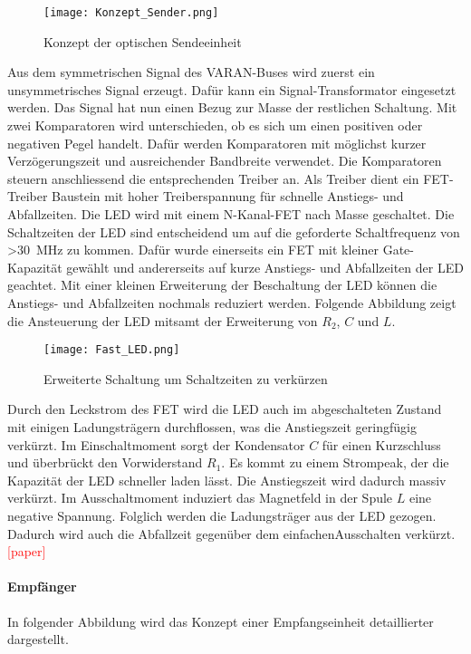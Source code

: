 \begin{figure}[H]
	\centering
	\texttt{[image: Konzept\_Sender.png]}
	\caption{Konzept der optischen Sendeeinheit}\label{fig:Konzept_Sender}
\end{figure}

Aus dem symmetrischen Signal des VARAN-Buses wird zuerst ein unsymmetrisches Signal erzeugt. Dafür kann ein Signal-Transformator eingesetzt werden. Das Signal hat nun einen Bezug zur Masse der restlichen Schaltung. Mit zwei Komparatoren wird unterschieden, ob es sich um einen positiven oder negativen Pegel handelt. Dafür werden Komparatoren mit möglichst kurzer Verzögerungszeit und ausreichender Bandbreite verwendet. Die Komparatoren steuern anschliessend die entsprechenden Treiber an. Als Treiber dient ein FET-Treiber Baustein mit hoher Treiberspannung für schnelle Anstiegs- und Abfallzeiten. Die LED wird mit einem N-Kanal-FET nach Masse geschaltet. Die Schaltzeiten der LED sind entscheidend um auf die geforderte Schaltfrequenz von \textgreater \SI{30}{MHz} zu kommen. Dafür wurde einerseits ein FET mit kleiner Gate-Kapazität gewählt und andererseits auf kurze Anstiegs- und Abfallzeiten der LED geachtet.
\newline
Mit einer kleinen Erweiterung der Beschaltung der LED können die Anstiegs- und Abfallzeiten nochmals reduziert werden. Folgende Abbildung zeigt die Ansteuerung der LED mitsamt der Erweiterung von $R_{2}$, $C$ und $L$.

 \begin{figure}[h]
 	\centering
 	\texttt{[image: Fast\_LED.png]}
 	\caption{Erweiterte Schaltung um Schaltzeiten zu verkürzen}\label{fig:Fast_LED}
 \end{figure}

Durch den Leckstrom des FET wird die LED auch im abgeschalteten Zustand mit einigen Ladungsträgern durchflossen, was die Anstiegszeit geringfügig verkürzt. Im Einschaltmoment sorgt der Kondensator $C$ für einen Kurzschluss und überbrückt den Vorwiderstand $R_{1}$. Es kommt zu einem Strompeak, der die Kapazität der LED schneller laden lässt. Die Anstiegszeit wird dadurch massiv verkürzt. Im Ausschaltmoment induziert das Magnetfeld in der Spule $L$ eine negative Spannung. Folglich werden die Ladungsträger aus der LED gezogen. Dadurch wird auch die Abfallzeit gegenüber dem \glqq einfachen\grqq Ausschalten verkürzt.\textcolor{red}{[paper]}

\paragraph{Empfänger}
In folgender Abbildung wird das Konzept einer Empfangseinheit detaillierter dargestellt.

